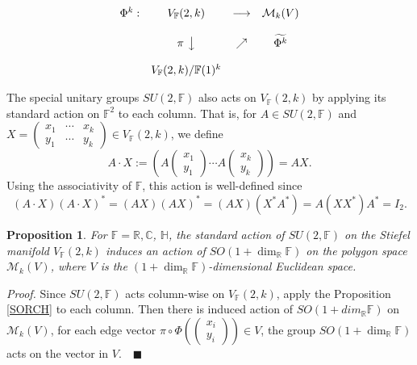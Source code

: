 \documentclass[a4paper]{article}%
\newtheorem{proposition}[theorem]{Proposition}
\newenvironment{proof}[1][Proof]{\noindent\textit{#1.} }{}
\begin{document}
\[%
\begin{matrix}
\Phi^{k}: & V_{\mathbb{F}}(2,k) & \longrightarrow & \mathcal{M}_{k}(V)\\
&  &  & \\
& \pi\ \big\downarrow & \nearrow & \widetilde{\Phi^{k}}\\
&  &  & \\
& V_{\mathbb{F}}(2,k)/\mathbb{F}(1)^{k} &  &
\end{matrix}
\]


The special unitary groups $SU(2,\mathbb{F})$ also acts on $V_{\mathbb{F}%
}(2,k)$ by applying its standard action on $\mathbb{F}^{2}$ to each column.
That is, for $A\in SU(2,\mathbb{F})$ and $X=%
\begin{pmatrix}
x_{1} & \cdots & x_{k}\\
y_{1} & \cdots & y_{k}%
\end{pmatrix}
\in V_{\mathbb{F}}(2,k)$, we define
\[
A\cdot X:=\left(  A%
\begin{pmatrix}
x_{1}\\
y_{1}%
\end{pmatrix}
\cdots A%
\begin{pmatrix}
x_{k}\\
y_{k}%
\end{pmatrix}
\right)  =AX.
\]
Using the associativity of $\mathbb{F}$, this action is well-defined since
\[
(A\cdot X)(A\cdot X)^{\ast}=(AX)(AX)^{\ast}=(AX)(X^{\ast}A^{\ast})=A(XX^{\ast
})A^{\ast}=I_{2}.
\]


\begin{proposition}
\label{SO} For $\mathbb{F}=\mathbb{R},\mathbb{C}$, $\mathbb{H}$, the standard
action of $SU(2,\mathbb{F})$ on the Stiefel manifold $V_{\mathbb{F}}(2,k)$
induces an action of $SO(1+\dim_{\mathbb{R}}\mathbb{F})$ on the polygon space
$\mathcal{M}_{k}(V)$, where $V$ is the $(1+\dim_{\mathbb{R}}\mathbb{F}%
)$-dimensional Euclidean space.
\end{proposition}

\begin{proof}
Since $SU(2,\mathbb{F})$ acts column-wise on $V_{\mathbb{F}}(2,k)$, apply the
Proposition \ref{SORCH} to each column. Then there is induced action of
$SO(1+dim_{\mathbb{R}}\mathbb{F})$ on $\mathcal{M}_{k}(V)$, for each edge
vector $\pi\circ\Phi\left(
\begin{pmatrix}
x_{i}\\
y_{i}%
\end{pmatrix}
\right)  \in V$, the group $SO(1+\dim_{\mathbb{R}}\mathbb{F})$ acts on the
vector in $V$.\ \ $\blacksquare$
\end{proof}
\end{document}
